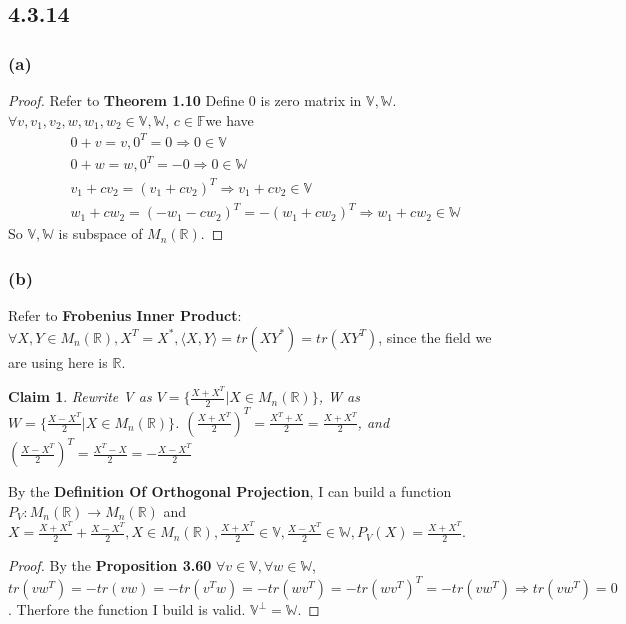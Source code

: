 \documentclass{article}
\newtheorem*{claim}{Claim}
\newtheorem*{proof}{Proof}
\begin{document}
\subsection*{4.3.14}
\subsubsection*{(a)}
\begin{proof}
    Refer to \textbf{Theorem 1.10}
    Define $0$ is zero matrix in $\mathbb{V, W}$. $\forall v, v_1, v_2, w , w_1, w_2\in \mathbb{V, W}$, $c \in \mathbb{F}$we have
    \begin{equation*}
        \begin{split}
            &0 + v = v, 0^T = 0 \Rightarrow 0 \in \mathbb{V}\\
            &0 + w = w, 0^T = -0 \Rightarrow 0 \in \mathbb{W} \\
            & v_1 + cv_2 = (v_1 + cv_2)^T \Rightarrow v_1 + cv_2 \in \mathbb{V} \\
            & w_1 + cw_2 = (-w_1 - cw_2)^T = -(w_1 + cw_2)^T\Rightarrow w_1 + cw_2 \in \mathbb{W} 
        \end{split}
    \end{equation*}
    So $\mathbb{V, W}$ is subspace of $M_n(\mathbb{R})$.
\end{proof}

\subsubsection*{(b)}
\noindent   Refer to \textbf{Frobenius Inner Product}: $ \forall X, Y \in M_n(\mathbb{R}), X^T = X^*, \langle X, Y \rangle = tr(XY^*) = tr(XY^T)$, since the field we are using here is $\mathbb{R}$.
    \begin{claim}
        Rewrite V as $V = \{ \frac {X + X ^ T} {2} | X \in M_n(\mathbb{R}) \}$, W as $W = \{ \frac {X - X ^ T} {2} | X \in M_n(\mathbb{R}) \}$.
        $(\frac {X + X ^ T} {2})^T = \frac {X^T + X} {2} = \frac {X + X^T} {2}$, and $(\frac {X - X ^ T} {2})^T = \frac {X^T - X} {2} = - \frac {X - X^T} {2}$
    \end{claim}
    By the \textbf{Definition Of Orthogonal Projection}, I can build a function $P_V: M_n(\mathbb{R}) \rightarrow M_n(\mathbb{R})$ 
    and $X = \frac {X + X ^ T} {2} + \frac {X - X ^ T} {2}, X \in M_n(\mathbb{R}), \frac{X + X ^ T} {2} \in \mathbb{V}, \frac {X - X ^ T} {2} \in \mathbb{W}, P_V(X) = 
    \frac {X + X ^ T} {2}$.
\begin{proof}
    By the \textbf{Proposition 3.60}
    $\forall v \in \mathbb{V}, \forall w \in \mathbb{W}$, $tr(vw^T) = -tr(vw) = -tr(v^Tw) = - tr(wv^T) = - tr(wv^T)^T = - tr(vw^T) \Rightarrow tr(vw^T) = 0$.
    Therfore the function I build is valid. $\mathbb{V^\bot} = \mathbb{W}$.
\end{proof}
 
\end{document}
